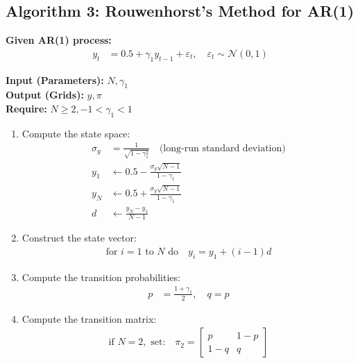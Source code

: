 \documentclass{article}
\begin{document}
\subsection*{Algorithm 3: Rouwenhorst’s Method for AR(1)}

\textbf{Given AR(1) process:}
\begin{align*}
    y_t &= 0.5 + \gamma_1 y_{t-1} + \varepsilon_t, \quad \varepsilon_t \sim \mathcal{N}(0,1)
\end{align*}

\textbf{Input (Parameters):} $N, \gamma_1$ \\
\textbf{Output (Grids):} $y, \pi$ \\

\textbf{Require:} $N \geq 2, -1 < \gamma_1 < 1$

\begin{enumerate}
    \item Compute the state space:
    \begin{align*}
        \sigma_y &= \frac{1}{\sqrt{1 - \gamma_1^2}} \quad \text{(long-run standard deviation)} \\
        y_1 &\leftarrow 0.5 - \frac{\sigma_y \sqrt{N-1}}{1 - \gamma_1} \\
        y_N &\leftarrow 0.5 + \frac{\sigma_y \sqrt{N-1}}{1 - \gamma_1} \\
        d &\leftarrow \frac{y_N - y_1}{N-1}
    \end{align*}
    
    \item Construct the state vector:
    \begin{align*}
        \text{for } i = 1 \text{ to } N \text{ do} \quad y_i = y_1 + (i - 1) d
    \end{align*}

    \item Compute the transition probabilities:
    \begin{align*}
        p &= \frac{1 + \gamma_1}{2}, \quad q = p
    \end{align*}

    \item Compute the transition matrix:
    \begin{align*}
        \text{if } N = 2, \text{ set:} \quad
        \pi_2 = 
        \begin{bmatrix}
            p & 1 - p \\
            1 - q & q
        \end{bmatrix}
    \end{align*}


\end{enumerate}
\end{document}
